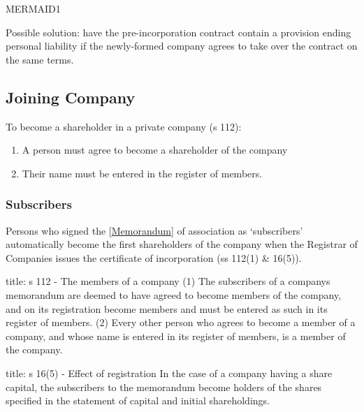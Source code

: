 \documentclass[
]{article}
\newenvironment{Shaded}{}{}
\newcommand{\NormalTok}[1]{#1}
\providecommand{\tightlist}{%
  \setlength{\itemsep}{0pt}\setlength{\parskip}{0pt}}
\begin{document}
MERMAID1

Possible solution: have the pre-incorporation contract contain a
provision ending personal liability if the newly-formed company agrees
to take over the contract on the same terms.

\hypertarget{joining-company}{%
\subsection{Joining Company}\label{joining-company}}

To become a shareholder in a private company (s 112):

\begin{enumerate}
\def\labelenumi{\arabic{enumi}.}
\tightlist
\item
  A person must agree to become a shareholder of the company
\item
  Their name must be entered in the register of members.
\end{enumerate}

\hypertarget{subscribers}{%
\subsubsection{Subscribers}\label{subscribers}}

Persons who signed the
{[}\protect\hyperlink{memorandum-1}{Memorandum}{]} of association as
`subscribers' automatically become the first shareholders of the company
when the Registrar of Companies issues the certificate of incorporation
(ss 112(1) \& 16(5)).

\begin{Shaded}
\begin{Highlighting}[]
\NormalTok{title: s 112 {-} The members of a company }
\NormalTok{(1) The subscribers of a company\textquotesingle{}s memorandum are deemed to have agreed to become members of the company, and on its registration become members and must be entered as such in its register of members.}
\NormalTok{(2) Every other person who agrees to become a member of a company, and whose name is entered in its register of members, is a member of the company.}
\end{Highlighting}
\end{Shaded}

\begin{Shaded}
\begin{Highlighting}[]
\NormalTok{title: s 16(5) {-} Effect of registration }
\NormalTok{In the case of a company having a share capital, the subscribers to the memorandum become holders of the shares specified in the statement of capital and initial shareholdings.}
\end{Highlighting}
\end{Shaded}
\end{document}
